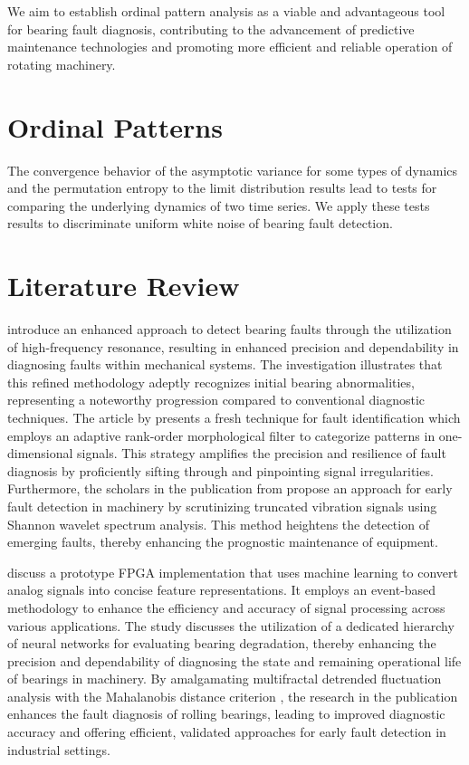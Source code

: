 \documentclass[sn-basic,pdflatex]{sn-jnl}
\theoremstyle{remark}
\theoremstyle{definition}
\begin{document}
We aim to establish ordinal pattern analysis as a viable and
advantageous tool for bearing fault diagnosis, contributing to the
advancement of predictive maintenance technologies and promoting more
efficient and reliable operation of rotating machinery.

\section{Ordinal Patterns}\label{sec2}

The convergence behavior of the asymptotic variance for some types of
dynamics and the permutation entropy to the limit distribution results
lead to tests for comparing the underlying dynamics of two time
series\citep{REY2024115481}. We apply these tests results to
discriminate uniform white noise of bearing fault detection.

\section{Literature Review}\label{sec3}

\citet{WOS:000312724900101} introduce an enhanced approach to detect
bearing faults through the utilization of high-frequency resonance,
resulting in enhanced precision and dependability in diagnosing faults
within mechanical systems. The investigation illustrates that this
refined methodology adeptly recognizes initial bearing abnormalities,
representing a noteworthy progression compared to conventional
diagnostic techniques. The article by \citep{WOS:000301688000008}
presents a fresh technique for fault identification which employs an
adaptive rank-order morphological filter to categorize patterns in
one-dimensional signals. This strategy amplifies the precision and
resilience of fault diagnosis by proficiently sifting through and
pinpointing signal irregularities. Furthermore, the scholars in the
publication from \citep{WOS:000303039300034} propose an approach for
early fault detection in machinery by scrutinizing truncated vibration
signals using Shannon wavelet spectrum analysis. This method heightens
the detection of emerging faults, thereby enhancing the prognostic
maintenance of equipment.

\citet{WOS:000345844100102} discuss a prototype FPGA implementation that
uses machine learning to convert analog signals into concise feature
representations. It employs an event-based methodology to enhance the
efficiency and accuracy of signal processing across various
applications. The \citep{WOS:000396580800080} study discusses the
utilization of a dedicated hierarchy of neural networks for evaluating
bearing degradation, thereby enhancing the precision and dependability
of diagnosing the state and remaining operational life of bearings in
machinery. By amalgamating multifractal detrended fluctuation analysis
with the Mahalanobis distance criterion \citep{WOS:000320835800016}, the
research in the publication enhances the fault diagnosis of rolling
bearings, leading to improved diagnostic accuracy and offering
efficient, validated approaches for early fault detection in industrial
settings.
\end{document}
